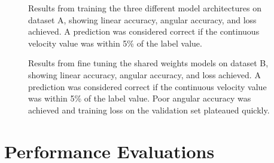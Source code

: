 \documentclass{article}
\begin{document}
\begin{figure}
  \centering
  \hfill
  \hfill
  \par
  \hfill
  \hfill
  \par
  \hfill
  \hfill
  \caption{Results from training the three different model architectures on dataset A, showing linear accuracy, angular accuracy, and loss achieved. A prediction was considered correct if the continuous velocity value was within 5\% of the label value.}
  \label{fig:training_results}
\end{figure}

\begin{figure}
  \centering
  \hfill
  \hfill
  \par
  \hfill
  \hfill
  \par
  \caption{Results from fine tuning the shared weights models on dataset B, showing linear accuracy, angular accuracy, and loss achieved. A prediction was considered correct if the continuous velocity value was within 5\% of the label value. Poor angular accuracy was achieved and training loss on the validation set plateaued quickly.}
  \label{fig:fine_tuning_training_results}
\end{figure}

\section{Performance Evaluations}
\end{document}
